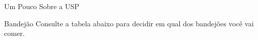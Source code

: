\begin{secao}{Um Pouco Sobre a USP}
\begin{subsecao}{Bandejão}
Consulte a tabela abaixo para decidir em qual dos bandejões você vai comer.
\pagebreak

\end{subsecao}

\end{secao}

